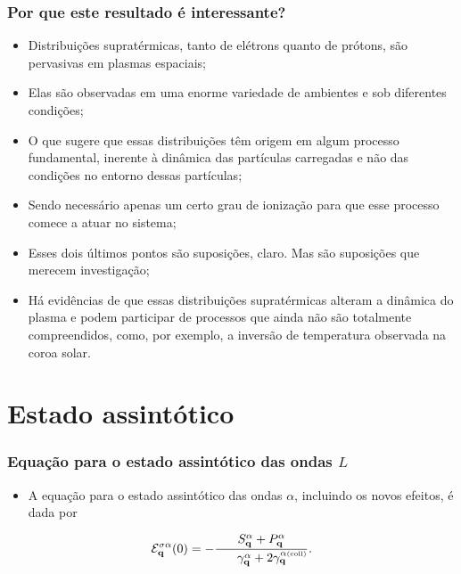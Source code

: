 \documentclass[10pt,aspectratio=1610,lualatex]{beamer}
\begin{document}
\begin{frame}
  \frametitle{Por que este resultado é interessante?}
  \begin{itemize}
    \item Distribuições supratérmicas, tanto de elétrons quanto de prótons,
    são pervasivas em plasmas espaciais;
    \vspace{0.1cm}
    \pause
    \item Elas são observadas em uma enorme variedade de ambientes e sob
    diferentes condições;
    \vspace{0.1cm}
    \pause
    \item O que sugere que essas distribuições têm origem em algum
    processo fundamental, inerente à dinâmica das partículas carregadas
    e não das condições no entorno dessas partículas;
    \vspace{0.1cm}
    \pause
    \item Sendo necessário apenas um certo grau de ionização para que
    esse processo comece a atuar no sistema;
    \vspace{0.1cm}
    \pause
    \item Esses dois últimos pontos são suposições, claro. Mas são suposições
    que merecem investigação;
    \vspace{0.1cm}
    \pause
    \item Há evidências de que essas distribuições supratérmicas alteram a dinâmica
    do plasma e podem participar de processos que ainda não são totalmente
    compreendidos, como, por exemplo, a inversão de temperatura observada na coroa
    solar.
  \end{itemize}
\end{frame}

\section*{Estado assintótico}
\begin{frame}\frametitle{Equação para o estado assintótico das ondas $L$}
  \begin{itemize}
  \item A equação para o estado assintótico das ondas $\alpha$,
    incluindo os novos efeitos, é dada por
  \end{itemize}
  \begin{equation}
    {\cal E}_{\bf q}^{\sigma {\alpha}}(0)
    =-\frac{S_{\bf q}^{\alpha} + P_{\bf q}^{\alpha}}{\hspace{0.60cm}\gamma_{\bf q}^{\alpha} 
  +2\gamma_{\bf q}^{{\alpha}\mbox{\tiny (coll)}}}.
  \end{equation}
\end{frame}
\end{document}
